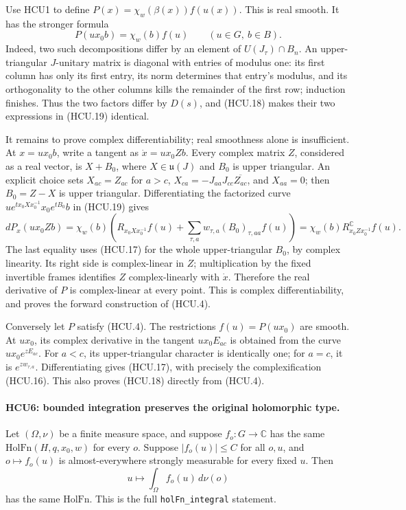 Use HCU1 to define
\(P(x)=\chi_w(\beta(x))f(u(x))\).
This is real smooth.  It has the stronger formula
\[
 P(ux_0b)=\chi_w(b)f(u)\qquad(u\in G,\ b\in B).
 \tag{HCU.19}
\]
Indeed, two such decompositions differ by an element of
\(U(J_\tau)\cap B_n\).  An upper-triangular \(J\)-unitary matrix is
diagonal with entries of modulus one: its first column has only its
first entry, its norm determines that entry's modulus, and its
orthogonality to the other columns kills the remainder of the first
row; induction finishes.  Thus the two factors differ by \(D(s)\),
and (HCU.18) makes their two expressions in (HCU.19) identical.

It remains to prove complex differentiability; real smoothness alone
is insufficient.  At \(x=ux_0b\), write a tangent as
\(\dot x=ux_0Zb\).  Every complex matrix \(Z\), considered as a real
vector, is \(X+B_0\), where \(X\in\mathfrak u(J)\) and \(B_0\)
is upper triangular.  An explicit choice sets
\(X_{ac}=Z_{ac}\) for \(a>c\),
\(X_{ca}=-J_{aa}J_{cc}\overline{Z_{ac}}\), and \(X_{aa}=0\);
then \(B_0=Z-X\) is upper triangular.  Differentiating the factorized
curve
\(u e^{t x_0Xx_0^{-1}}x_0 e^{tB_0}b\) in (HCU.19) gives
\[
 dP_x(ux_0Zb)=\chi_w(b)
 \left(R_{x_0Xx_0^{-1}}f(u)
            +\sum_{\tau,a}w_{\tau,a}(B_0)_{\tau,aa}f(u)\right)
 =\chi_w(b)R^{\mathbb C}_{x_0Zx_0^{-1}}f(u).
 \tag{HCU.20}
\]
The last equality uses (HCU.17) for the whole upper-triangular
\(B_0\), by complex linearity.  Its right side is complex-linear in
\(Z\); multiplication by the fixed invertible frames identifies \(Z\)
complex-linearly with \(\dot x\).  Therefore the real derivative of
\(P\) is complex-linear at every point.  This is complex
differentiability, and proves the forward construction of (HCU.4).

Conversely let \(P\) satisfy (HCU.4).
The restrictions \(f(u)=P(ux_0)\) are smooth.
At \(ux_0\), its complex derivative in the tangent
\(ux_0E_{ac}\) is obtained from the curve \(ux_0e^{zE_{ac}}\).
For \(a<c\), its upper-triangular character is identically one; for
\(a=c\), it is \(e^{zw_{\tau,a}}\).
Differentiating gives (HCU.17), with precisely the complexification
(HCU.16).  This also proves (HCU.18) directly from (HCU.4).

\paragraph{HCU6: bounded integration preserves the original holomorphic type.}
\label{claim:HCU6}
Let \((\Omega,\nu)\) be a finite measure space, and suppose
\(f_o:G\to\mathbb C\) has the same \(\mathrm{HolFn}(H,q,x_0,w)\)
for every \(o\).  Suppose
\(|f_o(u)|\le C\) for all \(o,u\), and \(o\mapsto f_o(u)\) is
almost-everywhere strongly measurable for every fixed \(u\).
Then
\[
 u\longmapsto\int_\Omega f_o(u)\,d\nu(o)
 \tag{HCU.21}
\]
has the same \(\mathrm{HolFn}\).  This is the full
\texttt{holFn\_integral} statement.

